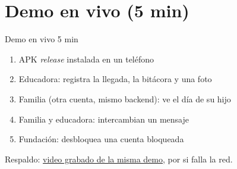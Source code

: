 \section{Demo en vivo (5 min)}

\begin{frame}{Demo en vivo \hfill\small 5 min}
  \large
  \begin{enumerate}
    \item APK \textit{release} instalada en un teléfono
    \item Educadora: registra la llegada, la bitácora y una foto
    \item Familia (otra cuenta, mismo backend): ve el día de su hijo
    \item Familia y educadora: intercambian un mensaje
    \item Fundación: desbloquea una cuenta bloqueada
  \end{enumerate}
  \vspace{1em}
  \normalsize Respaldo: \href{https://drive.google.com/file/d/12scqGtx0UNwZK7dzs1meVS2RLC9BJlBB/view?usp=sharing}{video grabado de la misma demo}, por si falla la red.
\end{frame}
